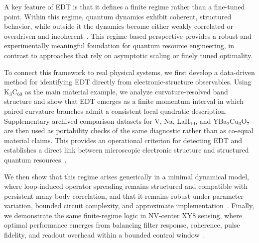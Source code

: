 A key feature of EDT is that it defines a finite regime rather than a fine-tuned point. Within this regime, quantum dynamics exhibit coherent, structured behavior, while outside it the dynamics become either weakly correlated or overdriven and incoherent~\cite{Larkin1969,Swingle2018}. This regime-based perspective provides a robust and experimentally meaningful foundation for quantum resource engineering, in contrast to approaches that rely on asymptotic scaling or finely tuned optimality.

To connect this framework to real physical systems, we first develop a data-driven method for identifying EDT directly from electronic-structure observables. Using K$_3$C$_{60}$ as the main material example, we analyze curvature-resolved band structure and show that EDT emerges as a finite momentum interval in which paired curvature branches admit a consistent local quadratic description. Supplementary archived comparison datasets for V, Na, LaH$_{10}$, and YBa$_2$Cu$_3$O$_7$ are then used as portability checks of the same diagnostic rather than as co-equal material claims. This provides an operational criterion for detecting EDT and establishes a direct link between microscopic electronic structure and structured quantum resources~\cite{Gunnarsson1997,Capone2009}.

We then show that this regime arises generically in a minimal dynamical model, where loop-induced operator spreading remains structured and compatible with persistent many-body correlation, and that it remains robust under parameter variation, bounded circuit complexity, and approximate implementation~\cite{Lloyd1996,Childs2019}. Finally, we demonstrate the same finite-regime logic in NV-center XY8 sensing, where optimal performance emerges from balancing filter response, coherence, pulse fidelity, and readout overhead within a bounded control window~\cite{Degen2017,Barry2020,Casola2018}.
